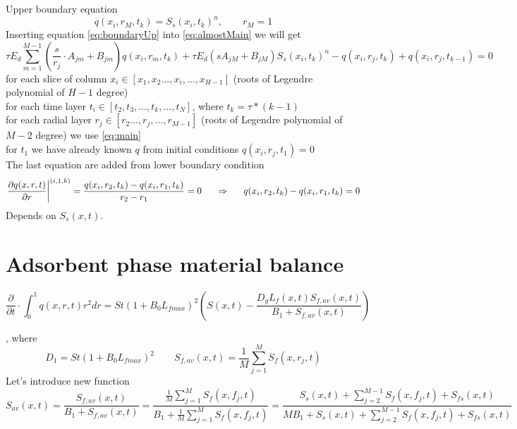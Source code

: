 \documentclass[12pt]{article}
\begin{document}
Upper boundary equation
\begin{equation} \label{eq:boundaryUp}
	q(x_i,r_M,t_k) = S_s(x_i, t_k)^n, \qquad r_M=1
\end{equation}
Inserting equation \eqref{eq:boundaryUp} into \eqref{eq:almostMain} we will get
\begin{equation} \label{eq:main}
\tau E_d\sum_{m=1}^{M-1} \left(\dfrac{s}{r_j} \cdot A_{jm} + B_{jm} \right) q(x_i,r_m,t_{k})  +\tau E_d\left(sA_{jM} + B_{jM} \right)S_s(x_i, t_k)^n - q(x_i,r_j,t_{k}) + q(x_i,r_j,t_{k-1})  = 0
\end{equation}
for each slice of column $x_i \in [x_1, x_2 ..., x_i, ..., x_{H-1}]$ (roots of Legendre polynomial of $H-1$ degree) \\
for each time layer $t_i \in [t_2, t_3, ..., t_k, ..., t_N]$, where $t_k=\tau*(k-1)$ \\
for each radial layer  $r_j \in [r_2 ..., r_j, ..., r_{M-1}]$ (roots of Legendre polynomial of $M-2$ degree) we use \eqref{eq:main}\\
for $t_1$ we have already known $q$ from initial conditions $q(x_i,r_j,t_1) = 0$\\
The last equation are added from lower boundary condition
\begin{equation}\label{eq:lowerBoundary}
	\left.\dfrac{\partial q(x,r,t)}{\partial r}\right\vert^{(i, 1, k)}=
	\dfrac{q(x_i,r_2,t_{k}) - q(x_i,r_1,t_{k})}{r_2-r_1}=0 \indent\Rightarrow\indent q(x_i,r_2,t_k) - q(x_i,r_1,t_k)=0
\end{equation}
Depends on $S_s(x, t)$.

\section{Adsorbent phase material balance}
\begin{equation}
	 \frac{\partial}{\partial t} \cdot \int_{0}^{1}q(x,r,t)r^2dr=St(1+B_0L_{fmax})^2\left(S(x,t)-\frac{D_gL_f(x,t)S_{f,av}(x,t)}{B_1+S_{f,av}(x,t)}\right)
\end{equation}

, where
\begin{equation}
D_1 = St(1+B_0L_{fmax})^2
\qquad
S_{f,av}(x,t) = \frac{1}{M}\sum_{j=1}^{M}S_f(x, r_j, t)
\end{equation}
Let's introduce new function
\begin{equation}\label{eq:S_av}
	S_{av}(x,t) = \frac{S_{f,av}(x,t)}{B_1+S_{f,av}(x,t)} = 
	\frac{\frac{1}{M}\sum_{j=1}^{M}S_f(x, f_j, t)}{B_1+\frac{1}{M}\sum_{j=1}^{M}S_f(x, f_j, t)}=
	\frac{S_s(x, t)+\sum_{j=2}^{M-1}S_f(x, f_j, t)+S_{fs}(x, t)}{MB_1+S_s(x, t)+\sum_{j=2}^{M-1}S_f(x, f_j, t)+S_{fs}(x, t)}
\end{equation}
\end{document}
